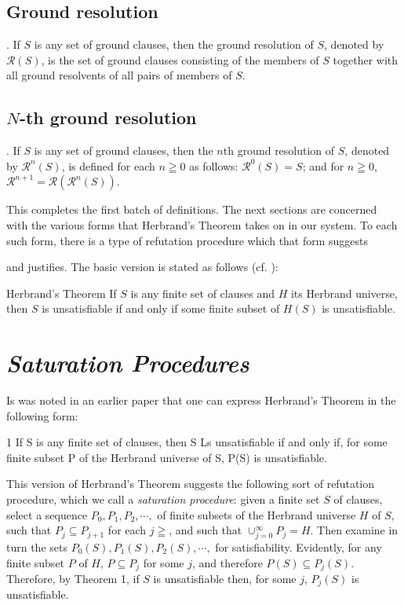 \documentclass[8pt]{extarticle}
\begin{document}
\subsection{Ground resolution}. If $S$ is any set of ground clauses, then the ground resolution of $S$, denoted by $\mathcal{R}(S)$, is the set of ground clauses consisting of the members of $S$ together with all ground resolvents of all pairs of members of $S$.

\subsection{$N$-th ground resolution}. If $S$ is any set of ground clauses, then the $n$th ground resolution of $S$, denoted by $\mathcal{R}^n(S)$, is defined for each $n\geqq 0$ as follows: $\mathcal{R}^0(S) = S$; and for $n\geqq 0$, $\mathcal{R}^{n+1} = \mathcal{R}(\mathcal{R}^n(S))$.

This completes the first batch of definitions. The next sections are concerned with the various forms that Herbrand's Theorem takes on in our system. To each such form, there is a type of refutation procedure which that form suggests

\noindent and justifies. The basic version is stated as follows (cf. \cite{davis_1960,gilmore_1960}):

\begin{p5herbrandt}{Herbrand's Theorem}\label{p5herbrandt}
If $S$ is any finite set of clauses and $H$ its Herbrand universe, then $S$ is unsatisfiable if and only if some finite subset of $H(S)$ is unsatisfiable.
\end{p5herbrandt}

\section{\emph{Saturation Procedures}}

Is was noted in an earlier paper \cite{robinson_1963} that one can express Herbrand's Theorem in the following form:

\begin{p5theorem}{1}\label{p5theorem}
If S is any finite set of clauses, then S Ls unsatisfiable if and only if, for some finite subset P of the Herbrand universe of S, P(S) is unsatisfiable. 
\end{p5theorem}

This version of Herbrand's Theorem suggests the following sort of refutation procedure, which we call a \emph{saturation procedure}: given a finite set $S$ of clauses, select a sequence $P_0, P_1, P_2, \dotsm ,$ of finite subsets of the Herbrand universe $H$ of $S$, such that $P_j \subseteq P_{j+1}$ for each $j\geqq$, and such that  $\cup_{j=0}^\infty P_j = H$. Then examine in turn the sets $P_0(S),P_1(S),P_2(S), \dotsm ,$ for satisfiability. Evidently, for any finite subset $P$ of $H$, $P \subseteq P_j$ for some $j$, and therefore $P(S) \subseteq P_j(S)$. Therefore, by Theorem 1, if $S$ is unsatisfiable then, for some $j$, $P_j(S)$ is unsatisfiable.
\end{document}
